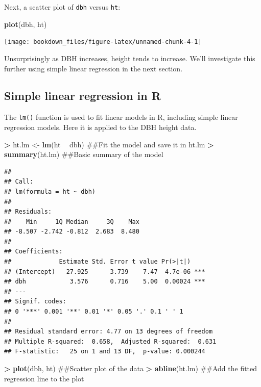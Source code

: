 \documentclass[]{krantz}
\makeatletter
\newenvironment{Shaded}{\begin{snugshade}}{\end{snugshade}}
\newcommand{\KeywordTok}[1]{\textcolor[rgb]{0.27,0.27,0.27}{\textbf{#1}}}
\newcommand{\StringTok}[1]{\textcolor[rgb]{0.5,0.5,0.5}{#1}}
\newcommand{\OperatorTok}[1]{\textcolor[rgb]{0.43,0.43,0.43}{\textbf{#1}}}
\newcommand{\NormalTok}[1]{#1}
\newenvironment{kframe}{%
\medskip{}
\setlength{\fboxsep}{.8em}
 \def\at@end@of@kframe{}%
 \ifinner\ifhmode%
  \def\at@end@of@kframe{\end{minipage}}%
  \begin{minipage}{\columnwidth}%
 \fi\fi%
 \def\FrameCommand##1{\hskip\@totalleftmargin \hskip-\fboxsep
 \colorbox{shadecolor}{##1}\hskip-\fboxsep
     \hskip-\linewidth \hskip-\@totalleftmargin \hskip\columnwidth}%
 \MakeFramed {\advance\hsize-\width
   \@totalleftmargin\z@ \linewidth\hsize
   \@setminipage}}%
 {\par\unskip\endMakeFramed%
 \at@end@of@kframe}
\renewenvironment{Shaded}{\begin{kframe}}{\end{kframe}}
\theoremstyle{definition}
\theoremstyle{definition}
\theoremstyle{definition}
\theoremstyle{remark}
\makeatother
\begin{document}
Next, a scatter plot of \texttt{dbh} versus \texttt{ht}:

\begin{Shaded}
\begin{Highlighting}[]
\KeywordTok{plot}\NormalTok{(dbh, ht)}
\end{Highlighting}
\end{Shaded}

\begin{center}\texttt{[image: bookdown\_files/figure-latex/unnamed-chunk-4-1]} \end{center}

Unsurprisingly as DBH increases, height tends to increase. We'll
investigate this further using simple linear regression in the next
section.

\subsection{Simple linear regression in
R}\label{simple-linear-regression-in-r}

The \texttt{lm()} function is used to fit linear models in R, including
simple linear regression models. Here it is applied to the DBH height
data.

\begin{Shaded}
\begin{Highlighting}[]
\OperatorTok{>}\StringTok{ }\NormalTok{ht.lm <-}\StringTok{ }\KeywordTok{lm}\NormalTok{(ht }\OperatorTok{~}\StringTok{ }\NormalTok{dbh) ##Fit the model and save it in ht.lm}
\OperatorTok{>}\StringTok{ }\KeywordTok{summary}\NormalTok{(ht.lm)  ##Basic summary of the model}
\end{Highlighting}
\end{Shaded}

\begin{verbatim}
## 
## Call:
## lm(formula = ht ~ dbh)
## 
## Residuals:
##    Min     1Q Median     3Q    Max 
## -8.507 -2.742 -0.812  2.683  8.480 
## 
## Coefficients:
##             Estimate Std. Error t value Pr(>|t|)    
## (Intercept)   27.925      3.739    7.47  4.7e-06 ***
## dbh            3.576      0.716    5.00  0.00024 ***
## ---
## Signif. codes:  
## 0 '***' 0.001 '**' 0.01 '*' 0.05 '.' 0.1 ' ' 1
## 
## Residual standard error: 4.77 on 13 degrees of freedom
## Multiple R-squared:  0.658,  Adjusted R-squared:  0.631 
## F-statistic:   25 on 1 and 13 DF,  p-value: 0.000244
\end{verbatim}

\begin{Shaded}
\begin{Highlighting}[]
\OperatorTok{>}\StringTok{ }\KeywordTok{plot}\NormalTok{(dbh, ht) ##Scatter plot of the data}
\OperatorTok{>}\StringTok{ }\KeywordTok{abline}\NormalTok{(ht.lm) ##Add the fitted regression line to the plot}
\end{Highlighting}
\end{Shaded}
\end{document}
